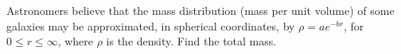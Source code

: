Astronomers believe that the mass distribution (mass per unit volume) of some galaxies may be 
approximated, in spherical coordinates, by $\rho=ae^{-br}$, for $0\le r\le\infty$, where $\rho$
is the density.
Find the total mass.
